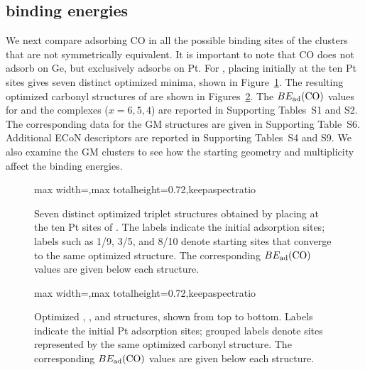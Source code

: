 \subsection[CO binding energies]{ binding energies}

We next compare adsorbing CO in all the possible binding sites of the clusters that are not symmetrically equivalent. It is important to note that CO does not adsorb on Ge, but exclusively adsorbs on Pt. For , placing  initially at the ten Pt sites gives seven distinct optimized minima, shown in Figure~\ref{fig:tfg_pt10co_series}. The resulting optimized carbonyl structures of  are shown in  Figures~\ref{fig:tfg_ptgeco_series}.
The \(BE_{\rm ad}(\ce{CO})\) values for  and the
 complexes ($x=6,5,4$) are reported in 
Supporting Tables~S1 and S2. The corresponding data for the
GM structures are given in Supporting Table~S6.
Additional ECoN descriptors are reported in Supporting Tables~S4
and S9. We also examine the GM clusters to see
how the starting geometry and multiplicity affect the binding energies. 

\begin{figure}[htbp]
\centering
\begin{adjustbox}{max width=\linewidth,max totalheight=0.72\textheight,keepaspectratio}

\end{adjustbox}
\caption{Seven distinct optimized triplet  structures obtained by
placing  at the ten Pt sites of . The labels indicate the
initial adsorption sites; labels such as 1/9, 3/5, and 8/10 denote starting
sites that converge to the same optimized structure. The corresponding
$BE_{\rm ad}(\ce{CO})$ values are given below each structure.}
\label{fig:tfg_pt10co_series}
\end{figure}



\begin{figure}[htbp]
\centering
\begin{adjustbox}{max width=\linewidth,max totalheight=0.72\textheight,keepaspectratio}

\end{adjustbox}
\caption{Optimized , ,
and  structures, shown from top to bottom. Labels indicate the initial Pt adsorption sites; grouped labels denote sites represented by the same
optimized carbonyl structure. The corresponding $BE_{\rm ad}(\ce{CO})$ values are given below each structure.}
\label{fig:tfg_ptgeco_series}
\end{figure}




